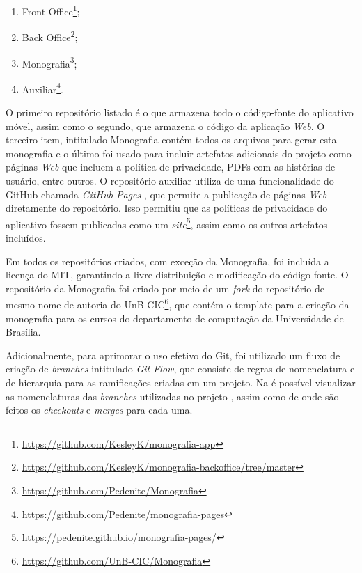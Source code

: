 \begin{enumerate}
    \item Front Office\footnote{\url{https://github.com/KesleyK/monografia-app}};
    \item Back Office\footnote{\url{https://github.com/KesleyK/monografia-backoffice/tree/master}};
    \item Monografia\footnote{\url{https://github.com/Pedenite/Monografia}};
    \item Auxiliar\footnote{\url{https://github.com/Pedenite/monografia-pages}}.
\end{enumerate}

O primeiro repositório listado é o que armazena todo o código-fonte do aplicativo móvel, assim como o segundo, que armazena o código da aplicação \textit{Web}. O terceiro item, intitulado Monografia contém todos os arquivos para gerar esta monografia e o último foi usado para incluir artefatos adicionais do projeto como páginas \textit{Web} que incluem a política de privacidade, PDFs com as histórias de usuário, entre outros. O repositório auxiliar utiliza de uma funcionalidade do GitHub chamada \textit{GitHub Pages} \cite{github-pages}, que permite a publicação de páginas \textit{Web} diretamente do repositório. Isso permitiu que as políticas de privacidade do aplicativo fossem publicadas como um \textit{site}\footnote{\url{https://pedenite.github.io/monografia-pages/}}, assim como os outros artefatos incluídos.

Em todos os repositórios criados, com exceção da Monografia, foi incluída a licença do MIT, garantindo a livre distribuição e modificação do código-fonte. O repositório da Monografia foi criado por meio de um \textit{fork} do repositório de mesmo nome de autoria do UnB-CIC\footnote{\url{https://github.com/UnB-CIC/Monografia}}, que contém o template para a criação da monografia para os cursos do departamento de computação da Universidade de Brasília. 

Adicionalmente, para aprimorar o uso efetivo do Git, foi utilizado um fluxo de criação de \textit{branches} intitulado \textit{Git Flow}, que consiste de regras de nomenclatura e de hierarquia para as ramificações criadas em um projeto. Na  é possível visualizar as nomenclaturas das \textit{branches} utilizadas no projeto \appName, assim como de onde são feitos os \textit{checkouts} e \textit{merges} para cada uma.


